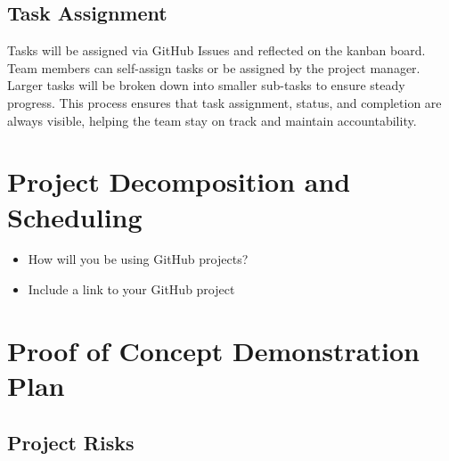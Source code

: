 \documentclass{article}
\begin{document}
\subsection{Task Assignment}
Tasks will be assigned via GitHub Issues and reflected on the kanban board. Team members can self-assign tasks or be assigned by the project manager. Larger tasks will be broken down into smaller sub-tasks to ensure steady progress. This process ensures that task assignment, status, and completion are always visible, helping the team stay on track and maintain accountability.


\section{Project Decomposition and Scheduling}

\begin{itemize}
  \item How will you be using GitHub projects?
  \item Include a link to your GitHub project
\end{itemize}


\section{Proof of Concept Demonstration Plan}

\subsection{Project Risks}
\end{document}
